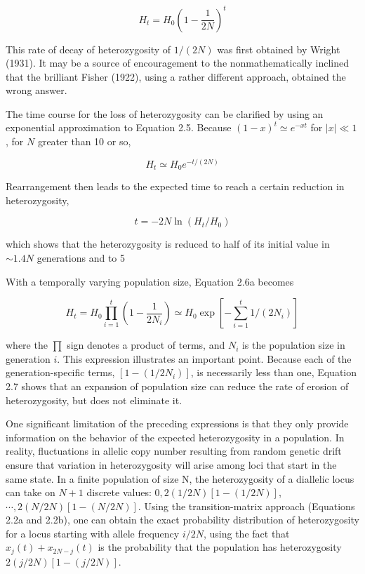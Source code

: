 \documentclass{article}
\begin{document}
\begin{equation}
H_{t}=H_{0}\left(1-\frac{1}{2N}\right)^{t}
\tag{2.5}
\label{eq:2_5}
\end{equation}

This rate of decay of heterozygosity of  $ 1/(2N) $ was first obtained by Wright (1931). It may be a source of encouragement to the nonmathematically inclined that the brilliant Fisher (1922), using a rather different approach, obtained the wrong answer.

The time course for the loss of heterozygosity can be clarified by using an exponential approximation to Equation 2.5. Because  $ (1 - x)^t \simeq e^{-xt} $ for  $ |x| \ll 1 $, for  $ N $ greater than 10 or so,

\begin{equation}
H_{t}\simeq H_{0}e^{-t/(2N)}
\tag{2.6a}
\label{eq:2_6a}
\end{equation}

Rearrangement then leads to the expected time to reach a certain reduction in heterozygosity,

\begin{equation}
t=-2N\ln(H_{t}/H_{0})
\tag{2.6b}
\label{eq:2_6b}
\end{equation}

which shows that the heterozygosity is reduced to half of its initial value in  $ \sim 1.4N $ generations and to 5%

With a temporally varying population size, Equation 2.6a becomes

\begin{equation}
H_{t}=H_{0}\prod_{i=1}^{t}\left(1-\frac{1}{2N_{i}}\right)\simeq H_{0}\exp\left[-\sum_{i=1}^{t}1/(2N_{i})\right]
\tag{2.7}
\label{eq:2_7}
\end{equation}

where the  $ \prod $ sign denotes a product of terms, and  $ N_i $ is the population size in generation  $ i $. This expression illustrates an important point. Because each of the generation-specific terms,  $ [1 - (1/2N_i)] $, is necessarily less than one, Equation 2.7 shows that an expansion of population size can reduce the rate of erosion of heterozygosity, but does not eliminate it.

One significant limitation of the preceding expressions is that they only provide information on the behavior of the expected heterozygosity in a population. In reality, fluctuations in allelic copy number resulting from random genetic drift ensure that variation in heterozygosity will arise among loci that start in the same state. In a finite population of size N, the heterozygosity of a diallelic locus can take on  $ N + 1 $ discrete values:  $ 0, 2(1/2N)[1 - (1/2N)] $,  $ \cdots, 2(N/2N)[1 - (N/2N)] $. Using the transition-matrix approach (Equations 2.2a and 2.2b), one can obtain the exact probability distribution of heterozygosity for a locus starting with allele frequency  $ i/2N $, using the fact that  $ x_j(t) + x_{2N-j}(t) $ is the probability that the population has heterozygosity  $ 2(j/2N)[1 - (j/2N)] $.
\end{document}
